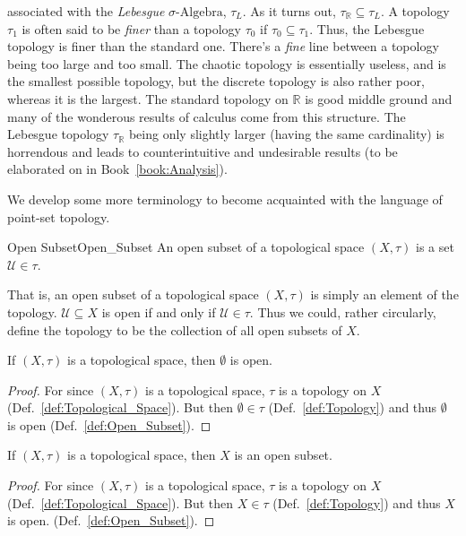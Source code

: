     associated with the \textit{Lebesgue} $\sigma\textrm{-Algebra}$,
    $\tau_{L}$. As it turns out, $\tau_{\mathbb{R}}\subseteq\tau_{L}$. A
    topology $\tau_{1}$ is often said to be \textit{finer} than a topology
    $\tau_{0}$ if $\tau_{0}\subseteq\tau_{1}$. Thus, the Lebesgue topology is
    finer than the standard one. There's a \textit{fine} line between a topology
    being too large and too small. The chaotic topology is essentially useless,
    and is the smallest possible topology, but the discrete topology is also
    rather poor, whereas it is the largest. The standard topology on
    $\mathbb{R}$ is good middle ground and many of the wonderous results of
    calculus come from this structure. The Lebesgue topology $\tau_{\mathbb{R}}$
    being only slightly larger (having the same cardinality) is horrendous and
    leads to counterintuitive and undesirable results (to be elaborated on
    in Book~\ref{book:Analysis}).
    \par\hfill\par
    We develop some more terminology to become acquainted with the language of
    point-set topology.
    \begin{fdefinition}{Open Subset}{Open_Subset}
        An open subset of a \gls{topological space} $(X,\tau)$ is a \gls{set}
        $\mathcal{U}\in\tau$.
    \end{fdefinition}
    That is, an open subset of a topological space $(X,\tau)$ is simply an
    element of the topology. $\mathcal{U}\subseteq{X}$ is open if and only if
    $\mathcal{U}\in\tau$. Thus we could, rather circularly, define the topology
    to be the collection of all open subsets of $X$.
    \begin{theorem}
        \label{thm:Emptyset_Is_Open}%
        If $(X,\tau)$ is a topological space, then $\emptyset$ is open.
    \end{theorem}
    \begin{proof}
        For since $(X,\tau)$ is a topological space, $\tau$ is a topology on $X$
        (Def.~\ref{def:Topological_Space}). But then $\emptyset\in\tau$
        (Def.~\ref{def:Topology}) and thus $\emptyset$ is open
        (Def.~\ref{def:Open_Subset}).
    \end{proof}
    \begin{theorem}
        \label{thm:Whole_Space_Is_Open}%
        If $(X,\tau)$ is a topological space, then $X$ is an open subset.
    \end{theorem}
    \begin{proof}
        For since $(X,\tau)$ is a topological space, $\tau$ is a topology on $X$
        (Def.~\ref{def:Topological_Space}). But then
        $X\in\tau$ (Def.~\ref{def:Topology}) and thus $X$ is open.
        (Def.~\ref{def:Open_Subset}).
    \end{proof}
